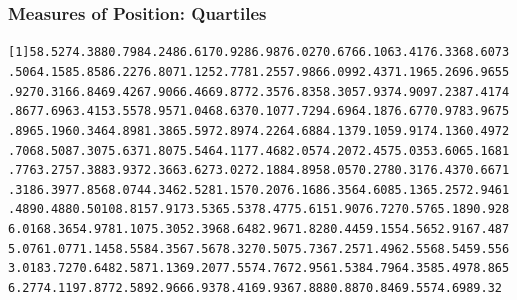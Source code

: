 \documentclass[xcolor=dvipsnames]{beamer}
\begin{document}
\begin{frame}
  \frametitle{Measures of Position: Quartiles}
\begin{alltt}
\footnotesize
  [1]  58.52  74.38  80.79  84.24  86.61  70.92  86.98  76.02  70.67  66.10  63.41  76.33  68.60  73.50  64.15  85.85  86.22  76.80  71.12  52.77  81.25  57.98  66.09  92.43  71.19  65.26  96.96  55.92  70.31  66.84  69.42  67.90  66.46  69.87  72.35  76.83  58.30  57.93  74.90  97.23  87.41  74.86  77.69  63.41  53.55  78.95  71.04  68.63  70.10  77.72  94.69  64.18  76.67  70.97  83.96  75.89  65.19  60.34  64.89  81.38  65.59  72.89  74.22  64.68  84.13  79.10  59.91  74.13  60.49  72.70  68.50  87.30  75.63  71.80  75.54  64.11  77.46  82.05  74.20  72.45  75.03  53.60  65.16  81.77  63.27  57.38  83.93  72.36  63.62  73.02  72.18  84.89  58.05  70.27  80.31  76.43  70.66  71.31  86.39  77.85  68.07  44.34  62.52  81.15  70.20  76.16  86.35  64.60  85.13  65.25  72.94  61.48  90.48  80.50 108.81  57.91  73.53  65.53  78.47  75.61  51.90  76.72  70.57  65.18  90.92  86.01  68.36  54.97  81.10  75.30  52.39  68.64  82.96  71.82  80.44  59.15  54.56  52.91  67.48  75.07  61.07  71.14  58.55  84.35  67.56  78.32  70.50  75.73  67.25  71.49  62.55  68.54  59.55  63.01  83.72  70.64  82.58  71.13  69.20  77.55  74.76  72.95  61.53  84.79  64.35  85.49  78.86  56.27  74.11  97.87  72.58  92.96  66.93  78.41  69.93  67.88  80.88  70.84  69.55  74.69  89.32
\end{alltt}
\end{frame}
\end{document}
